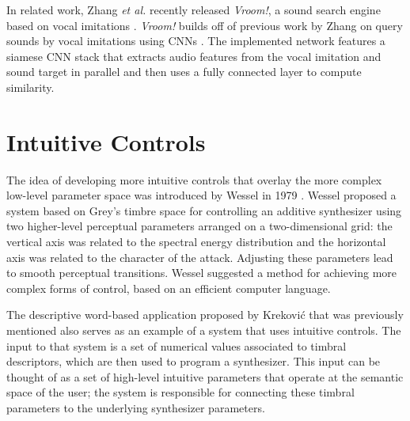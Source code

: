 
In related work, Zhang \textit{et al.} recently released \textit{Vroom!}, a sound search engine based on vocal imitations \cite{zhang2020vroom}. \textit{Vroom!} builds off of previous work by Zhang on query sounds by vocal imitations using CNNs \cite{zhang2017iminet, zhang2018visualization}. The implemented network features a siamese CNN stack that extracts audio features from the vocal imitation and sound target in parallel and then uses a fully connected layer to compute similarity.

\section{Intuitive Controls}
The idea of developing more intuitive controls that overlay the more complex low-level parameter space was introduced by Wessel in 1979 \cite{wessel1979timbre}. Wessel proposed a system based on Grey's timbre space \cite{grey1977multidimensional} for controlling an additive synthesizer using two higher-level perceptual parameters arranged on a two-dimensional grid: the vertical axis was related to the spectral energy distribution and the horizontal axis was related to the character of the attack. Adjusting these parameters lead to smooth perceptual transitions. Wessel suggested a method for achieving more complex forms of control, based on an efficient computer language.

The descriptive word-based application proposed by Krekovi\'{c} that was previously mentioned \cite{krekovic2016algorithm} also serves as an example of a system that uses intuitive controls. The input to that system is a set of numerical values associated to timbral descriptors, which are then used to program a synthesizer. This input can be thought of as a set of high-level intuitive parameters that operate at the semantic space of the user; the system is responsible for connecting these timbral parameters to the underlying synthesizer parameters.

